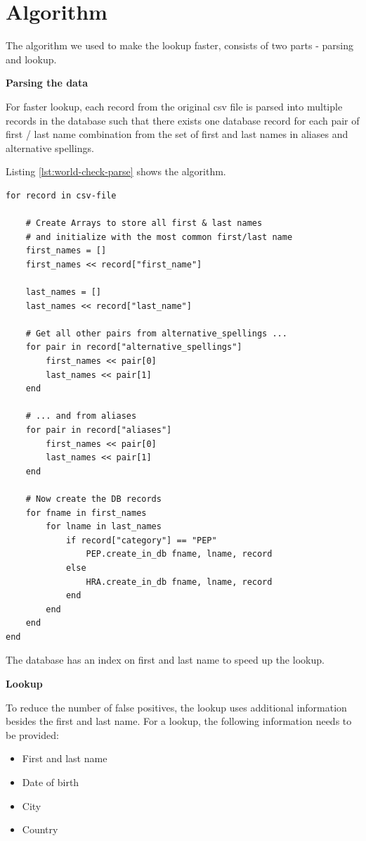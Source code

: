 \documentclass[a4paper, oneside]{csthesis}
\begin{document}
\section{Algorithm}

The algorithm we used to make the lookup faster, consists of two parts - parsing and lookup.

\textbf{Parsing the data}

For faster lookup, each record from the original csv file is parsed into multiple records in the database such that there exists one database record for each pair of first / last name combination from the set of first and last names in aliases and alternative spellings.

Listing \ref{lst:world-check-parse} shows the algorithm.

\begin{lstlisting}[caption={The Algorithm that parses the csv file creates a separate DB record for each first/last name pair},label={lst:world-check-parse}]
for record in csv-file

    # Create Arrays to store all first & last names
    # and initialize with the most common first/last name
    first_names = []
    first_names << record["first_name"]

    last_names = []
    last_names << record["last_name"]

    # Get all other pairs from alternative_spellings ...
    for pair in record["alternative_spellings"]
        first_names << pair[0]
        last_names << pair[1]
    end

    # ... and from aliases
    for pair in record["aliases"]
        first_names << pair[0]
        last_names << pair[1]
    end

    # Now create the DB records
    for fname in first_names
        for lname in last_names
            if record["category"] == "PEP"
                PEP.create_in_db fname, lname, record
            else
                HRA.create_in_db fname, lname, record
            end
        end
    end
end
\end{lstlisting}

The database has an index on first and last name to speed up the lookup.



\textbf{Lookup}

To reduce the number of false positives, the lookup uses additional information besides the first and last name. For a lookup, the following information needs to be provided:
\begin{itemize}
\item First and last name
\item Date of birth
\item City
\item Country
\end{itemize}
\end{document}
